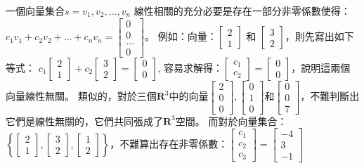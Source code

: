 \documentclass[11pt]{article}
\begin{document}
{一個向量集合\(s = v_1, v_2, \dots, v_n\)
線性相關的充分必要是存在一部分非零係數使得：\(c_1v_1 + c_2v_2 + \dots + c_nv_n = \begin{bmatrix} 0 \\ 0 \\ \dots \\ 0 \end{bmatrix}\)。
例如：向量：\(\begin{bmatrix}2 \\ 1\end{bmatrix}\) 和
\(\begin{bmatrix}3 \\ 2\end{bmatrix}\)，則先寫出如下等式：
\(c_1 \begin{bmatrix}2 \\ 1\end{bmatrix} + c_2 \begin{bmatrix}3 \\ 2\end{bmatrix} = \begin{bmatrix}0 \\ 0\end{bmatrix}\),
容易求解得：\(\begin{bmatrix}c_1 \\ c_2\end{bmatrix} = \begin{bmatrix}0 \\ 0\end{bmatrix}\)，說明這兩個向量線性無關。
類似的，對於三個\(\mathbf{R}^3\)中的向量\(\begin{bmatrix}2 \\ 0 \\ 0\end{bmatrix}, \begin{bmatrix} 0 \\ 1 \\ 0\end{bmatrix}\)和\(\begin{bmatrix} 0 \\ 0 \\ 7\end{bmatrix}\)，不難判斷出它們是線性無關的，它們共同張成了\(\mathbf{R}^3\)空間。
而對於向量集合：\(\left\{\begin{bmatrix}2 \\ 1\end{bmatrix}, \begin{bmatrix}3 \\ 2\end{bmatrix}, \begin{bmatrix}1 \\ 2 \end{bmatrix}\right\}\)，不難算出存在非零係數：\(\begin{bmatrix}c_1 \\ c_2 \\ c_3\end{bmatrix} = \begin{bmatrix}-4 \\ 3 \\ -1\end{bmatrix}\)
}
\end{document}
